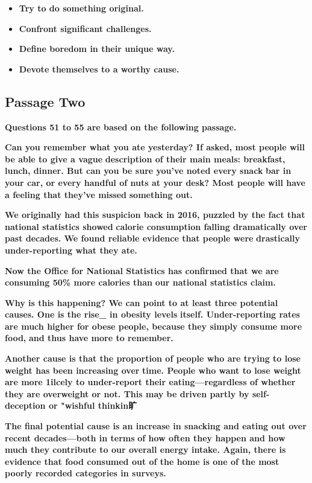 \documentclass[UTF8,11pt]{ctexart}
\begin{document}
\begin{itemize}[leftmargin=2em,itemsep=.2em,topsep=.4em]\item[A.] \textbf{Try to do something original.}
\item[B.] \textbf{Confront significant challenges.}
\item[C.] \textbf{Define boredom in their unique way.}
\item[D.] \textbf{Devote themselves to a worthy cause.}
\end{itemize}

\subsection*{\textbf{Passage Two}}


\textbf{Questions 51 to 55 are based on the following passage.}


\textbf{Can you remember what you ate yesterday? If asked, most people will be able to give a vague} \textbf{description of their main meals: breakfast, lunch, dinner. But can you be sure you've noted every snack} \textbf{bar in your car, or every handful of nuts at your desk? Most people will have a feeling that they've missed} \textbf{something out.}


\textbf{We originally had this suspicion back in 2016, puzzled by the fact that national statistics showed} \textbf{calorie consumption falling dramatically over past decades. We found reliable evidence that people were} \textbf{drastically under-reporting what they ate.}


\textbf{Now the Office for National Statistics has confirmed that we are consuming 50\% more calories than} \textbf{our national statistics claim.}


\textbf{Why is this happening? We can point to at least three potential causes. One is the rise\_ in obesity levels} \textbf{itself. Under-reporting rates are much higher for obese people, because they simply consume more food,} \textbf{and thus have more to remember.}


\textbf{Another cause is that the proportion of people who are trying to lose weight has been increasing over} \textbf{time. People who want to lose weight are more 1ilcely to under-report their eating—regardless of whether} \textbf{they are overweight or not. This may be driven partly by self-deception or "wishful thinkin旷}


\textbf{The final potential cause is an increase in snacking and eating out over recent decades—both in terms} \textbf{of how often they happen and how much they contribute to our overall energy intake. Again, there is} \textbf{evidence that food consumed out of the home is one of the most poorly recorded categories in surveys.}
\end{document}
